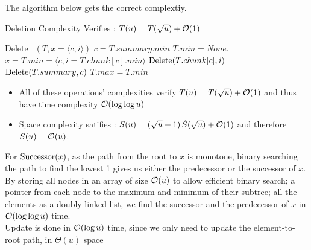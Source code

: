 \documentclass{cours}
\begin{document}
\begin{proposition}[Deletion]
    The algorithm below gets the correct complextiy.
    \begin{algorithm}
        \caption{Deletion Complexity Verifies : $T(u) = T(\sqrt{u}) + \mathcal{O}(1)$}
        \begin{algorithmic}
            \Function \textmd{Delete}
                \Input $\ \ (T, x = \langle c, i \rangle)$
                \EndInput
                    \State $c = T.summary.min$
                        \State $T.min = None$. \Return
                    \EndIf
                    \State $x = T.min = \langle c, i = T.chunk[c].min \rangle$
                \EndIf
                \State $\textmd{Delete}(T.chunk[c], i)$
                    \State $\textmd{Delete}(T.summary, c)$
                \EndIf
                    \State $T.max = T.min$
                \Else 
                \EndIf
            \EndFunction
        \end{algorithmic}
    \end{algorithm}
\end{proposition}

\begin{proposition}[Complexity]
    \begin{itemize}
        \item All of these operations' complexities verify $T(u) = T(\sqrt{u}) + \mathcal{O}(1)$ and thus have time complexity $\mathcal{O}(\log \log u)$
        \item Space complexity satifies : $S(u) = \left(\sqrt{u} + 1\right)\dot S(\sqrt{u}) + \mathcal{O}(1)$ and therefore $S(u) = \mathcal{O}(u)$.
    \end{itemize}
\end{proposition}

\begin{proposition}
    For $\textmd{Successor}(x)$, as the path from the root to $x$ is monotone, binary searching the path to find the lowest 1 gives us either the predecessor or the successor of $x$. By storing all nodes in an array of size $\mathcal{O}(u)$ to allow efficient binary search; a pointer from each node to the maximum and minimum of their subtree; all the elements as a doubly-linked list, we find the successor and the predecessor of $x$ in $\mathcal{O}(\log \log u)$ time.\\
    Update is done in $\mathcal{O}(\log u)$ time, since we only need to update the element-to-root path, in $\Theta(u)$ space
\end{proposition}
\end{document}
